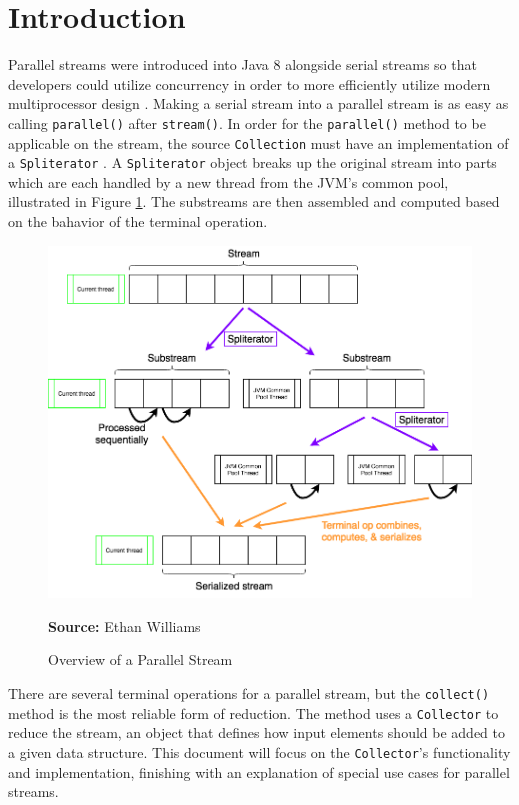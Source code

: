 \documentclass[oneside, 12pt]{article}
\newcommand{\source}[1]{\textbf{Source:} {#1} }
\begin{document}
\section{Introduction}
Parallel streams were introduced into Java 8 alongside serial streams so that developers could utilize concurrency in order to more efficiently utilize modern multiprocessor design \autocite{ibm_streams}. Making a serial stream into a parallel stream is as easy as calling \verb|parallel()| after \verb|stream()|. In order for the \verb|parallel()| method to be applicable on the stream, the source \verb|Collection| must have an implementation of a \verb|Spliterator| \autocite{ibm_streams}. A \verb|Spliterator| object breaks up the original stream into parts which are each handled by a new thread from the JVM's common pool, illustrated in Figure \ref{fig:overview}. The substreams are then assembled and computed based on the bahavior of the terminal operation.

\begin{figure}[H]
\centering
\includegraphics[width=13cm]{../images/overview.png}
\caption{Overview of a Parallel Stream}
\source{Ethan Williams}
\label{fig:overview}
\end{figure}

There are several terminal operations for a parallel stream, but the \verb|collect()| method is the most reliable form of reduction. The method uses a \verb|Collector| to reduce the stream, an object that defines how input elements should be added to a given data structure. This document will focus on the \verb|Collector|'s functionality and implementation, finishing with an explanation of special use cases for parallel streams.
\end{document}
